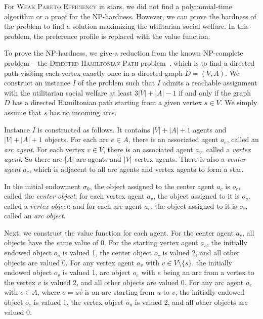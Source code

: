 For \textsc{Weak Pareto Efficiency} in stars, we did not find a polynomial-time algorithm or a proof for the NP-hardness.
However, we can prove the hardness of the problem to find a solution maximizing the utilitarian social welfare.
In this problem, the preference profile is replaced with the value function.


To prove the NP-hardness, we give a reduction from the known NP-complete problem -- the \textsc{Directed Hamiltonian Path} problem~\cite{DBLP:books/fm/GareyJ79}, which is to find a directed path visiting each vertex exactly once in a directed graph $D=(V,A)$.
We construct an instance $I$ of the problem such that $I$ admits a reachable assignment with the utilitarian social welfare at least $3|V|+|A|-1$ if and only if the graph $D$ has a directed Hamiltonian path starting from a given vertex $s\in V$. We simply assume that $s$ has no incoming arcs.

Instance $I$ is constructed as follows. It contains $|V|+|A|+1$ agents and $|V|+|A|+1$ objects.
For each arc $e\in A$, there is an associated agent $a_e$, called an \emph{arc agent}.
For each vertex $v\in V$, there is an associated agent $a_v$, called a \emph{vertex agent}.
So there are $|A|$ arc agents and $|V|$ vertex agents. There is also a \emph{center agent} $a_c$, which is adjacent to all arc agents
and vertex agents to form a star.

In the initial endowment $\sigma_0$,
the object assigned to the center agent $a_c$ is $o_c$, called the \emph{center object}; for each vertex agent $a_v$, the object assigned to it is
$o_v$, called a \emph{vertex object}; and for each arc agent $a_e$,
the object assigned to it is $o_e$, called an \emph{arc object}.

Next, we construct the value function for each agent.
For the center agent $a_c$, all objects have the same value of $0$.
For the starting vertex agent $a_s$, the initially endowed object $o_s$ is valued 1, the center object $o_c$ is valued 2, and all other objects are valued 0.
For  any vertex agent $a_v$ with $v\in V\setminus\{s\}$, the initially endowed object $o_v$ is valued 1, arc object $o_e$
with $e$ being an arc from a vertex to the vertex $v$
is valued 2, and all other objects are valued 0.
For any arc agent $a_e$ with $e\in A$, where $e=\overrightarrow{uv}$ is an arc starting from $u$ to $v$, the initially endowed object $o_e$ is valued 1, the vertex object $o_u$ is valued 2, and all other objects are valued 0.

